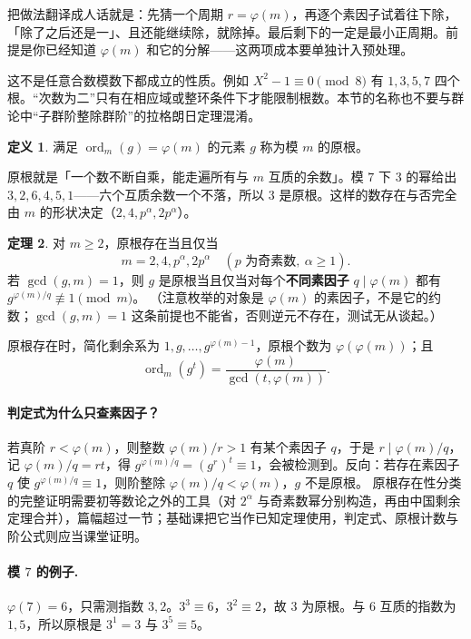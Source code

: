 \documentclass[UTF8,a4paper,11pt,oneside,openany,fontset=fandol]{ctexbook}
\theoremstyle{definition}
\newtheorem{definition}{定义}[chapter]
\newtheorem{theorem}[definition]{定理}
\newcommand{\ord}{\operatorname{ord}}
\begin{document}
\begin{tip}
把做法翻译成人话就是：先猜一个周期 $r=\varphi(m)$，再逐个素因子试着往下除，「除了之后还是一」、且还能继续除，就除掉。最后剩下的一定是最小正周期。前提是你已经知道 $\varphi(m)$ 和它的分解——这两项成本要单独计入预处理。
\end{tip}


\begin{pitfall}
这不是任意合数模数下都成立的性质。例如 $X^2-1\equiv0\pmod8$ 有 $1,3,5,7$ 四个根。“次数为二”只有在相应域或整环条件下才能限制根数。本节的名称也不要与群论中“子群阶整除群阶”的拉格朗日定理混淆。
\end{pitfall}


\begin{definition}
满足 $\ord_m(g)=\varphi(m)$ 的元素 $g$ 称为模 $m$ 的原根。
\end{definition}

\begin{tip}[原根一句话]
原根就是「一个数不断自乘，能走遍所有与 $m$ 互质的余数」。模 $7$ 下 $3$ 的幂给出 $3,2,6,4,5,1$——六个互质余数一个不落，所以 $3$ 是原根。这样的数存在与否完全由 $m$ 的形状决定（$2,4,p^\alpha,2p^\alpha$）。
\end{tip}

\begin{theorem}
对 $m\ge2$，原根存在当且仅当
\[
 m=2,4,p^\alpha,2p^\alpha\quad(p\text{ 为奇素数},\ \alpha\ge1).
\]
若 $\gcd(g,m)=1$，则 $g$ 是原根当且仅当对每个\textbf{不同素因子} $q\mid\varphi(m)$ 都有 $g^{\varphi(m)/q}\not\equiv1\pmod m$。
（注意枚举的对象是 $\varphi(m)$ 的素因子，不是它的约数；$\gcd(g,m)=1$ 这条前提也不能省，否则逆元不存在，测试无从谈起。）
\end{theorem}
原根存在时，简化剩余系为 $1,g,\ldots,g^{\varphi(m)-1}$，原根个数为 $\varphi(\varphi(m))$；且
\[
 \ord_m(g^t)=\frac{\varphi(m)}{\gcd(t,\varphi(m))}.
\]

\paragraph{判定式为什么只查素因子？}
若真阶 $r<\varphi(m)$，则整数 $\varphi(m)/r>1$ 有某个素因子 $q$，于是 $r\mid\varphi(m)/q$，记 $\varphi(m)/q=rt$，得 $g^{\varphi(m)/q}=(g^r)^t\equiv1$，会被检测到。反向：若存在素因子 $q$ 使 $g^{\varphi(m)/q}\equiv1$，则阶整除 $\varphi(m)/q<\varphi(m)$，$g$ 不是原根。
原根存在性分类的完整证明需要初等数论之外的工具（对 $2^\alpha$ 与奇素数幂分别构造，再由中国剩余定理合并），篇幅超过一节；基础课把它当作已知定理使用，判定式、原根计数与阶公式则应当课堂证明。
\paragraph{模 $7$ 的例子.} $\varphi(7)=6$，只需测指数 $3,2$。$3^3\equiv6$，$3^2\equiv2$，故 $3$ 为原根。与 $6$ 互质的指数为 $1,5$，所以原根是 $3^1=3$ 与 $3^5\equiv5$。
\end{document}
